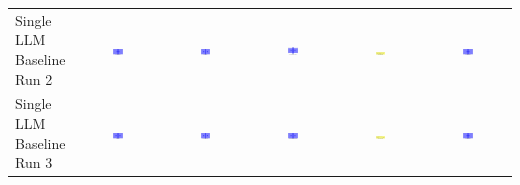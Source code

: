 \begin{table}
\begin{tabular}{@{}lccccc@{}}
    \makecell{Single LLM \\ Baseline \\ Run 2} & \includegraphics[width=0.13\textwidth]{./run_2/png/gpt-4o_results/BasicLayout.png} & \includegraphics[width=0.13\textwidth]{./run_2/png/o1-preview_results/BasicLayout.png} & \includegraphics[width=0.13\textwidth]{./run_2/png/claude-3-5-sonnet-20240620_results/BasicLayout.png} & \includegraphics[width=0.13\textwidth]{./run_2/png/watsonx_meta-llama_llama-3-1-70b-instruct_results/BasicLayout.png} & \includegraphics[width=0.13\textwidth]{./run_2/png/watsonx_meta-llama_llama-3-405b-instruct_results/BasicLayout.png} \\
    \makecell{Single LLM \\ Baseline \\ Run 3} & \includegraphics[width=0.13\textwidth]{./run_3/png/gpt-4o_results/BasicLayout.png} & \includegraphics[width=0.13\textwidth]{./run_3/png/o1-preview_results/BasicLayout.png} & \includegraphics[width=0.13\textwidth]{./run_3/png/claude-3-5-sonnet-20240620_results/BasicLayout.png} & \includegraphics[width=0.13\textwidth]{./run_3/png/watsonx_meta-llama_llama-3-1-70b-instruct_results/BasicLayout.png} & \includegraphics[width=0.13\textwidth]{./run_3/png/watsonx_meta-llama_llama-3-405b-instruct_results/BasicLayout.png} \\

\end{tabular}
\end{table}
